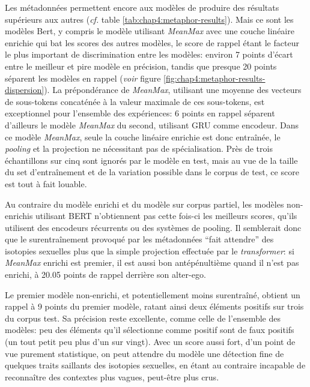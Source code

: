 Les métadonnées permettent encore aux modèles de produire des résultats supérieurs aux autres (\textit{cf.} table \ref{tab:chap4:metaphor-results}). Mais ce sont les modèles Bert, y compris le modèle utilisant \textit{MeanMax} avec une couche linéaire enrichie qui bat les scores des autres modèles, le score de rappel étant le facteur le plus important de discrimination entre les modèles: environ 7 points d'écart entre le meilleur et pire modèle en précision, tandis que presque 20 points séparent les modèles en rappel (\textit{voir} figure \ref{fig:chap4:metaphor-results-dispersion}). La prépondérance de \textit{MeanMax}, utilisant une moyenne des vecteurs de sous-tokens concaténée à la valeur maximale de ces sous-tokens, est exceptionnel pour l'ensemble des expériences: 6 points en rappel séparent d'ailleurs le modèle \textit{MeanMax} du second, utilisant GRU comme encodeur. Dans ce modèle \textit{MeanMax}, seule la couche linéaire enrichie est donc entraînée, le \textit{pooling} et la projection ne nécessitant pas de spécialisation. Près de trois échantillons sur cinq sont ignorés par le modèle en test, mais au vue de la taille du set d'entraînement et de la variation possible dans le corpus de test, ce score est tout à fait louable.

Au contraire du modèle enrichi et du modèle sur corpus partiel, les modèles non-enrichis utilisant BERT n'obtiennent pas cette fois-ci les meilleurs scores, qu'ils utilisent des encodeurs récurrents ou des systèmes de pooling. Il semblerait donc que le surentraînement provoqué par les métadonnées ``fait attendre'' des isotopies sexuelles plus que la simple projection effectuée par le \textit{transformer}: si \textit{MeanMax} enrichi est premier, il est aussi bon antépénultième quand il n'est pas enrichi, à 20.05 points de rappel derrière son alter-ego.

Le premier modèle non-enrichi, et potentiellement moins surentraîné, obtient un rappel à 9 points du premier modèle, ratant ainsi deux éléments positifs sur trois du corpus test. Sa précision reste excellente, comme celle de l'ensemble des modèles: peu des éléments qu'il sélectionne comme positif sont de faux positifs (un tout petit peu plus d'un sur vingt). Avec un score aussi fort, d'un point de vue purement statistique, on peut attendre du modèle une détection fine de quelques traits saillants des isotopies sexuelles, en étant au contraire incapable de reconnaître des contextes plus vagues, peut-être plus crus.

